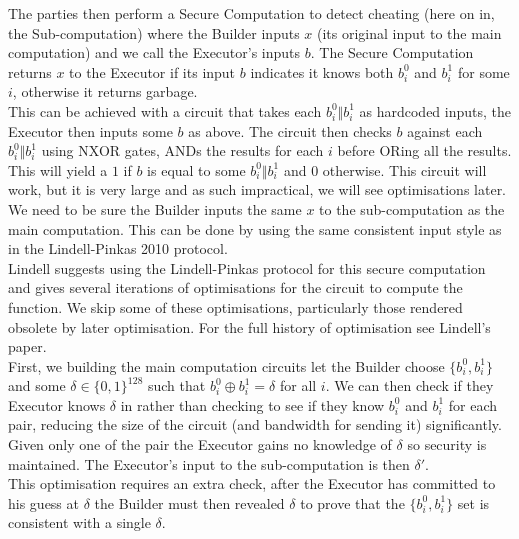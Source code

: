 \documentclass[ %
                    author={Nicholas Tutte},
                supervisor={Prof. Nigel Smart},
                    degree={MEng},
                     title={Secure Two Party Computation},
                  subtitle={A practical comparison of recent protocols},
                      type={Research - GG1K},
                      year={2015} ]{dissertation}
\begin{document}
				The parties then perform a Secure Computation to detect cheating (here on in, the Sub-computation) where the Builder inputs $x$ (its original input to the main computation) and  we call the Executor's inputs $b$. The Secure Computation returns $x$ to the Executor if its input $b$ indicates it knows both $b_i^0$ and $b_i^1$ for some $i$, otherwise it returns garbage.\\

				This can be achieved with a circuit that takes each $b_i^0 \Vert b_i^1$ as hardcoded inputs, the Executor then inputs some $b$ as above. The circuit then checks $b$ against each $b_i^0 \Vert b_i^1$ using NXOR gates, ANDs the results for each $i$ before ORing all the results. This will yield a $1$ if $b$ is equal to some $b_i^0 \Vert b_i^1$ and $0$ otherwise. This circuit will work, but it is very large and as such impractical, we will see optimisations later.\\

				We need to be sure the Builder inputs the same $x$ to the sub-computation as the main computation. This can be done by using the same consistent input style as in the Lindell-Pinkas 2010 protocol.\\

				Lindell suggests using the Lindell-Pinkas protocol for this secure computation and gives several iterations of optimisations for the circuit to compute the function. We skip some of these optimisations, particularly those rendered obsolete by later optimisation. For the full history of optimisation see Lindell's paper.\\

				First, we building the main computation circuits let the Builder choose $\{b_i^0, b_i^1\}$ and some $\delta \in \{0, 1\}^{128}$ such that $b_i^0 \oplus b_i^1 = \delta$ for all $i$. We can then check if they Executor knows $\delta$ in rather than checking to see if they know $b_i^0$ and $b_i^1$ for each pair, reducing the size of the circuit (and bandwidth for sending it) significantly. Given only one of the pair the Executor gains no knowledge of $\delta$ so security is maintained. The Executor's input to the sub-computation is then $\delta'$.\\

				This optimisation requires an extra check, after the Executor has committed to his guess at $\delta$ the Builder must then revealed $\delta$ to prove that the $\{b_i^0, b_i^1\}$ set is consistent with a single $\delta$.\\
\end{document}

